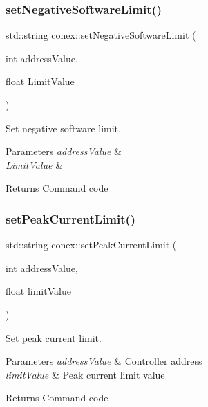 \subsubsection{\texorpdfstring{set\+Negative\+Software\+Limit()}{setNegativeSoftwareLimit()}}
{\footnotesize\ttfamily std\+::string conex\+::set\+Negative\+Software\+Limit (\begin{DoxyParamCaption}\item[{int}]{address\+Value,  }\item[{float}]{Limit\+Value }\end{DoxyParamCaption})}



Set negative software limit. 


\begin{DoxyParams}{Parameters}
{\em address\+Value} & \\
\hline
{\em Limit\+Value} & \\
\hline
\end{DoxyParams}
\begin{DoxyReturn}{Returns}
Command code 
\end{DoxyReturn}
\mbox{\label{namespaceconex_ad4e9c3f1429c4d356c4814c816b1ce42}} 
\subsubsection{\texorpdfstring{set\+Peak\+Current\+Limit()}{setPeakCurrentLimit()}}
{\footnotesize\ttfamily std\+::string conex\+::set\+Peak\+Current\+Limit (\begin{DoxyParamCaption}\item[{int}]{address\+Value,  }\item[{float}]{limit\+Value }\end{DoxyParamCaption})}



Set peak current limit. 


\begin{DoxyParams}{Parameters}
{\em address\+Value} & Controller address \\
\hline
{\em limit\+Value} & Peak current limit value \\
\hline
\end{DoxyParams}
\begin{DoxyReturn}{Returns}
Command code 
\end{DoxyReturn}
\mbox{\label{namespaceconex_a786f1251f31ef6a30a042ac4fdbfb815}} 
